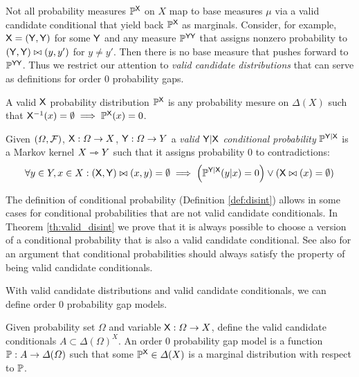 Not all probability measures $\mathbb{P}^{\mathsf{X}}$ on $X$ map to base measures $\mu$ via a valid candidate conditional that yield back $\mathbb{P}^{\mathsf{X}}$ as marginals. Consider, for example, $\mathsf{X}=(\mathsf{Y},\mathsf{Y})$ for some $\mathsf{Y}$ and any measure $\mathbb{P}^{\mathsf{YY}}$ that assigns nonzero probability to $(\mathsf{Y},\mathsf{Y})\bowtie (y,y')$ for $y\neq y'$. Then there is no base measure that pushes forward to $\mathbb{P}^{\mathsf{YY}}$. Thus we restrict our attention to \emph{valid candidate distributions} that can serve as definitions for order 0 probability gaps.

\begin{definition}\label{def:valid_dist}
A valid $\mathsf{X}$ probability distribution $\mathbb{P}^{\mathsf{X}}$ is any probability mesure on $\Delta(X)$ such that $\mathsf{X}^{-1}(x)=\emptyset\implies \mathbb{P}^{\mathsf{X}}(x) = 0$.
\end{definition}

\begin{definition}\label{def:valid_conditional_prob}
Given $(\Omega,\mathcal{F})$, $\mathsf{X}:\Omega\to X$, $\mathsf{Y}:\Omega\to Y$ a \emph{valid $\mathsf{Y}|\mathsf{X}$ conditional probability} $\mathbb{P}^{\mathsf{Y}|\mathsf{X}}$ is a Markov kernel $X\rightarrowtriangle Y$ such that it assigns probability 0 to contradictions:
\begin{align}
	\forall y\in Y, x\in X: (\mathsf{X},\mathsf{Y})\bowtie(x,y) = \emptyset \implies \left(\mathbb{P}^{\mathsf{Y}|\mathsf{X}}(y|x) = 0\right) \lor \left(\mathsf{X}\bowtie (x) = \emptyset\right)
\end{align}
\end{definition}

The definition of conditional probability (Definition \ref{def:disint}) allows in some cases for conditional probabilities that are not valid candidate conditionals. In Theorem \ref{th:valid_disint} we prove that it is always possible to choose a version of a conditional probability that is also a valid candidate conditional. See also \citet{hajek_what_2003} for an argument that conditional probabilities should always satisfy the property of being valid candidate conditionals.

With valid candidate distributions and valid candidate conditionals, we can define order 0 probability gap models.

\begin{definition}
Given probability set $\Omega$ and variable $\mathsf{X}:\Omega \to X$, define the valid candidate conditionals $A\subset \Delta(\Omega)^X$. An order 0 probability gap model is a function $\mathbb{P}:A\to \Delta(\Omega)$ such that some $\mathbb{P}^{\mathsf{X}}\in \Delta(X)$ is a marginal distribution with respect to $\mathbb{P}$.
\end{definition}

